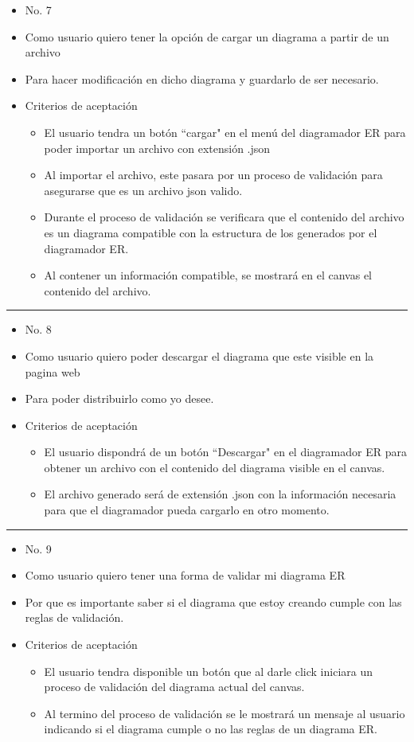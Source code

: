 \begin{itemize}
	\item No. 7
	\item Como usuario quiero tener la opción de cargar un diagrama a partir de un archivo
	\item Para hacer modificación en dicho diagrama y guardarlo de ser necesario.
	\item Criterios de aceptación
	\begin{itemize}
		\item El usuario tendra un botón ``cargar" en el menú del diagramador ER para poder importar un archivo con extensión .json
		\item Al importar el archivo, este pasara por un proceso de validación para asegurarse que es un archivo json valido.
		\item Durante el proceso de validación se verificara que el contenido del archivo es un diagrama compatible con la estructura de los generados por el diagramador ER.
		\item Al contener un información compatible, se mostrará en el canvas el contenido del archivo.
	\end{itemize}
\end{itemize}
\noindent\rule{\textwidth}{1pt}
\begin{itemize}
	\item No. 8
	\item Como usuario quiero poder descargar el diagrama que este visible en la pagina web
	\item Para poder distribuirlo como yo desee.
	\item Criterios de aceptación
	\begin{itemize}
		\item El usuario dispondrá de un botón ``Descargar" en el diagramador ER para obtener un archivo con el contenido del diagrama visible en el canvas.
		\item El archivo generado será de extensión .json con la información necesaria para que el diagramador pueda cargarlo en otro momento.
	\end{itemize}
\end{itemize}
\noindent\rule{\textwidth}{1pt}
\begin{itemize}
	\item No. 9
	\item Como usuario quiero tener una forma de validar mi diagrama ER
	\item Por que es importante saber si el diagrama que estoy creando cumple con las reglas de validación.
	\item Criterios de aceptación
	\begin{itemize}
		\item El usuario tendra disponible un botón que al darle click iniciara un proceso de validación del diagrama actual del canvas.
		\item Al termino del proceso de validación se le mostrará un mensaje al usuario indicando si el diagrama cumple o no las reglas de un diagrama ER.
	\end{itemize}
\end{itemize}
